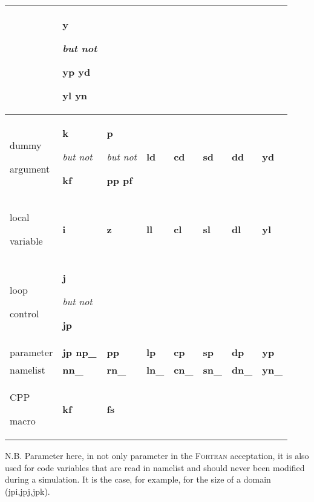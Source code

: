 \documentclass[../main/NEMO_manual]{subfiles}
\begin{document}
\begin{table}[htbp]
\begin{center}
\begin{tabular}{|p{45pt}|p{35pt}|p{45pt}|p{40pt}|p{40pt}|p{40pt}|p{40pt}|p{40pt}|}
      & \textbf{y} \par \textit{but not} \par \textbf{yp yd} \par \textbf{yl yn} \\
      \hline
      dummy \par argument
      & \textbf{k} \par \textit{but not} \par \textbf{kf}
      & \textbf{p} \par \textit{but not} \par \textbf{pp pf}
      & \textbf{ld}
      & \textbf{cd}
      & \textbf{sd}
      & \textbf{dd}
      & \textbf{yd} \\
      \hline
      local \par variable
      & \textbf{i}
      & \textbf{z}
      & \textbf{ll}
      & \textbf{cl}
      & \textbf{sl}
      & \textbf{dl}
      & \textbf{yl} \\
      \hline
      loop \par control
      & \textbf{j} \par \textit{but not} \par \textbf{jp} &&&&&& \\
      \hline
      parameter
      & \textbf{jp np\_}
      & \textbf{pp}
      & \textbf{lp}
      & \textbf{cp}
      & \textbf{sp}
      & \textbf{dp}
      & \textbf{yp} \\
      \hline
      namelist
      & \textbf{nn\_}
      & \textbf{rn\_}
      & \textbf{ln\_}
      & \textbf{cn\_}
      & \textbf{sn\_}
      & \textbf{dn\_}
      & \textbf{yn\_}
      \\
      \hline
      CPP \par macro
      & \textbf{kf}
      & \textbf{fs} \par &&&&& \\
      \hline
    \end{tabular}
    \label{tab:tab1}
  \end{center}
\end{table}

N.B. Parameter here, in not only parameter in the \textsc{Fortran} acceptation,
it is also used for code variables that are read in namelist and should never been modified during a simulation. 
It is the case, for example, for the size of a domain (jpi,jpj,jpk).

\newpage


\biblio
\end{document}

